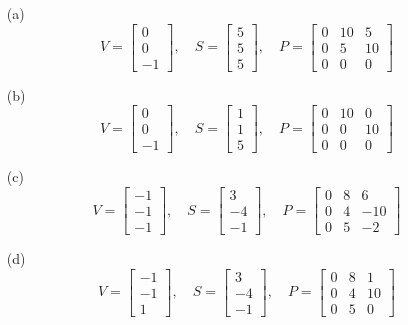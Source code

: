 \begin{enumerate}
    \item[(a)] 
    \[
    V = \begin{bmatrix} 0 \\ 0 \\ -1 \end{bmatrix}, 
    \quad S = \begin{bmatrix} 5 \\ 5 \\ 5 \end{bmatrix}, 
    \quad P = \begin{bmatrix} 0 & 10 & 5 \\ 0 & 5 & 10 \\ 0 & 0 & 0 \end{bmatrix}
    \]

    \item[(b)] 
    \[
    V = \begin{bmatrix} 0 \\ 0 \\ -1 \end{bmatrix}, 
    \quad S = \begin{bmatrix} 1 \\ 1 \\ 5 \end{bmatrix}, 
    \quad P = \begin{bmatrix} 0 & 10 & 0 \\ 0 & 0 & 10 \\ 0 & 0 & 0 \end{bmatrix}
    \]

    \item[(c)] 
    \[
    V = \begin{bmatrix} -1 \\ -1 \\ -1 \end{bmatrix}, 
    \quad S = \begin{bmatrix} 3 \\ -4 \\ -1 \end{bmatrix}, 
    \quad P = \begin{bmatrix} 0 & 8 & 6 \\ 0 & 4 & -10 \\ 0 & 5 & -2 \end{bmatrix}
    \]

    \item[(d)] 
    \[
    V = \begin{bmatrix} -1 \\ -1 \\ 1 \end{bmatrix}, 
    \quad S = \begin{bmatrix} 3 \\ -4 \\ -1 \end{bmatrix}, 
    \quad P = \begin{bmatrix} 0 & 8 & 1 \\ 0 & 4 & 10 \\ 0 & 5 & 0 \end{bmatrix}
    \]
\end{enumerate}

